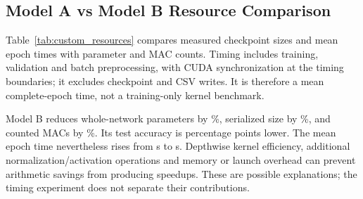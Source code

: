 \subsection{Model A vs Model B Resource Comparison}
Table~\ref{tab:custom_resources} compares measured checkpoint sizes and mean
epoch times with parameter and MAC counts. Timing includes training,
validation and batch preprocessing, with CUDA synchronization at the timing
boundaries; it excludes checkpoint and CSV writes. It is therefore a mean
complete-epoch time, not a training-only kernel benchmark.

Model B reduces whole-network parameters by \ParamReduction\%, serialized
size by \StorageReduction\%, and counted MACs by \MacReduction\%.
Its test accuracy is \CustomAccuracyGap{} percentage points lower. The mean
epoch time nevertheless rises from \AEpochTime{} s to \BEpochTime{} s.
Depthwise kernel efficiency, additional normalization/activation operations
and memory or launch overhead can prevent arithmetic savings from producing
speedups. These are possible explanations; the timing experiment does not
separate their contributions.
